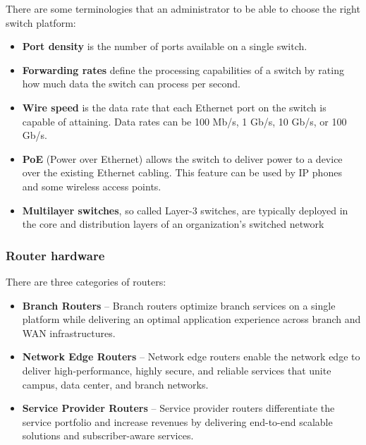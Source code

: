 There are some terminologies that an administrator to be able to choose the right switch platform:

\begin{itemize}
\item \textbf{Port density} is the number of ports available on a single switch.
\item \textbf{Forwarding rates} define the processing capabilities of a switch by rating how much data the switch can process per second.
\item \textbf{Wire speed}  is the data rate that each Ethernet port on the switch is capable of attaining. Data rates can be 100 Mb/s, 1 Gb/s, 10 Gb/s, or 100 Gb/s.
\item \textbf{PoE} (Power over Ethernet) allows the switch to deliver power to a device over the existing Ethernet cabling.  This feature can be used by IP phones and some wireless access points.
\item \textbf{Multilayer switches}, so called Layer-3 switches,  are typically deployed in the core and distribution layers of an organization's switched network
\end{itemize}

\subsubsection{Router hardware}

There are three categories of routers:
\begin{itemize}
\item \textbf{Branch Routers} -- Branch routers optimize branch services on a single platform while delivering an optimal application experience across branch and WAN infrastructures.
\item \textbf{Network Edge Routers} -- Network edge routers enable the network edge to deliver high-performance, highly secure, and reliable services that unite campus, data center, and branch networks.
\item \textbf{Service Provider Routers} -- Service provider routers differentiate the service portfolio and increase revenues by delivering end-to-end scalable solutions and subscriber-aware services.
\end{itemize}
